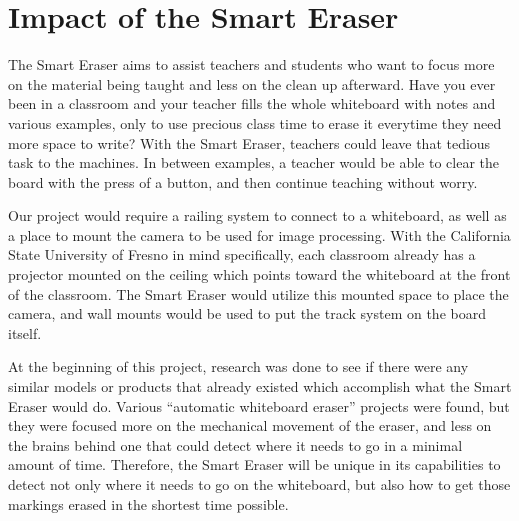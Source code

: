 \documentclass[10pt,onecolumn,draftclsnofoot]{IEEEtran} 					%
\begin{document}
	\section{Impact of the Smart Eraser}
	\setlength{\parindent}{5ex}
	The Smart Eraser aims to assist teachers and students who want to focus more on the material being taught and less on the clean up afterward. Have you ever been in a classroom and your teacher fills the whole whiteboard with notes and various examples, only to use precious class time to erase it everytime they need more space to write? With the Smart Eraser, teachers could leave that tedious task to the machines. In between examples, a teacher would be able to clear the board with the press of a button, and then continue teaching without worry.\par
	\setlength{\parindent}{5ex}
	Our project would require a railing system to connect to a whiteboard, as well as a place to mount the camera to be used for image processing. With the California State University of Fresno in mind specifically, each classroom already has a projector mounted on the ceiling which points toward the whiteboard at the front of the classroom. The Smart Eraser would utilize this mounted space to place the camera, and wall mounts would be used to put the track system on the board itself. \par
	\setlength{\parindent}{5ex}
	At the beginning of this project, research was done to see if there were any similar models or products that already existed which accomplish what the Smart Eraser would do. Various ``automatic whiteboard eraser'' projects were found, but they were focused more on the mechanical movement of the eraser, and less on the brains behind one that could detect where it needs to go in a minimal amount of time. Therefore, the Smart Eraser will be unique in its capabilities to detect not only where it needs to go on the whiteboard, but also how to get those markings erased in the shortest time possible.\\
	
\end{document}

